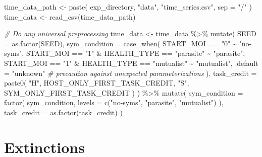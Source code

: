 \documentclass[
]{book}
\newenvironment{Shaded}{\begin{snugshade}}{\end{snugshade}}
\newcommand{\AttributeTok}[1]{\textcolor[rgb]{0.77,0.63,0.00}{#1}}
\newcommand{\CommentTok}[1]{\textcolor[rgb]{0.56,0.35,0.01}{\textit{#1}}}
\newcommand{\FunctionTok}[1]{\textcolor[rgb]{0.00,0.00,0.00}{#1}}
\newcommand{\NormalTok}[1]{#1}
\newcommand{\OtherTok}[1]{\textcolor[rgb]{0.56,0.35,0.01}{#1}}
\newcommand{\SpecialCharTok}[1]{\textcolor[rgb]{0.00,0.00,0.00}{#1}}
\newcommand{\StringTok}[1]{\textcolor[rgb]{0.31,0.60,0.02}{#1}}
\begin{document}
\begin{Shaded}
\begin{Highlighting}[]
\NormalTok{time\_data\_path }\OtherTok{\textless{}{-}} \FunctionTok{paste}\NormalTok{(}
\NormalTok{  exp\_directory,}
  \StringTok{"data"}\NormalTok{,}
  \StringTok{"time\_series.csv"}\NormalTok{,}
  \AttributeTok{sep =} \StringTok{"/"}
\NormalTok{)}
\NormalTok{time\_data }\OtherTok{\textless{}{-}} \FunctionTok{read\_csv}\NormalTok{(time\_data\_path)}

\CommentTok{\# Do any universal preprocessing}
\NormalTok{time\_data }\OtherTok{\textless{}{-}}\NormalTok{ time\_data }\SpecialCharTok{\%\textgreater{}\%}
  \FunctionTok{mutate}\NormalTok{(}
    \AttributeTok{SEED =} \FunctionTok{as.factor}\NormalTok{(SEED),}
    \AttributeTok{sym\_condition =} \FunctionTok{case\_when}\NormalTok{(}
\NormalTok{      START\_MOI }\SpecialCharTok{==} \StringTok{"0"} \SpecialCharTok{\textasciitilde{}} \StringTok{"no{-}syms"}\NormalTok{,}
\NormalTok{      START\_MOI }\SpecialCharTok{==} \StringTok{"1"} \SpecialCharTok{\&}\NormalTok{ HEALTH\_TYPE }\SpecialCharTok{==} \StringTok{"parasite"} \SpecialCharTok{\textasciitilde{}} \StringTok{"parasite"}\NormalTok{,}
\NormalTok{      START\_MOI }\SpecialCharTok{==} \StringTok{"1"} \SpecialCharTok{\&}\NormalTok{ HEALTH\_TYPE }\SpecialCharTok{==} \StringTok{"mutualist"} \SpecialCharTok{\textasciitilde{}} \StringTok{"mutualist"}\NormalTok{,}
      \AttributeTok{.default =} \StringTok{"unknown"} \CommentTok{\# precaution against unexpected parameterizations}
\NormalTok{    ),}
    \AttributeTok{task\_credit =} \FunctionTok{paste0}\NormalTok{(}
      \StringTok{"H"}\NormalTok{, HOST\_ONLY\_FIRST\_TASK\_CREDIT,}
      \StringTok{"S"}\NormalTok{, SYM\_ONLY\_FIRST\_TASK\_CREDIT}
\NormalTok{    )}
\NormalTok{  ) }\SpecialCharTok{\%\textgreater{}\%}
  \FunctionTok{mutate}\NormalTok{(}
    \AttributeTok{sym\_condition =} \FunctionTok{factor}\NormalTok{(}
\NormalTok{      sym\_condition,}
      \AttributeTok{levels =} \FunctionTok{c}\NormalTok{(}\StringTok{"no{-}syms"}\NormalTok{, }\StringTok{"parasite"}\NormalTok{, }\StringTok{"mutualist"}\NormalTok{)}
\NormalTok{    ),}
    \AttributeTok{task\_credit =} \FunctionTok{as.factor}\NormalTok{(task\_credit)}
\NormalTok{  )}
\end{Highlighting}
\end{Shaded}

\hypertarget{extinctions-5}{%
\section{Extinctions}\label{extinctions-5}}
\end{document}
